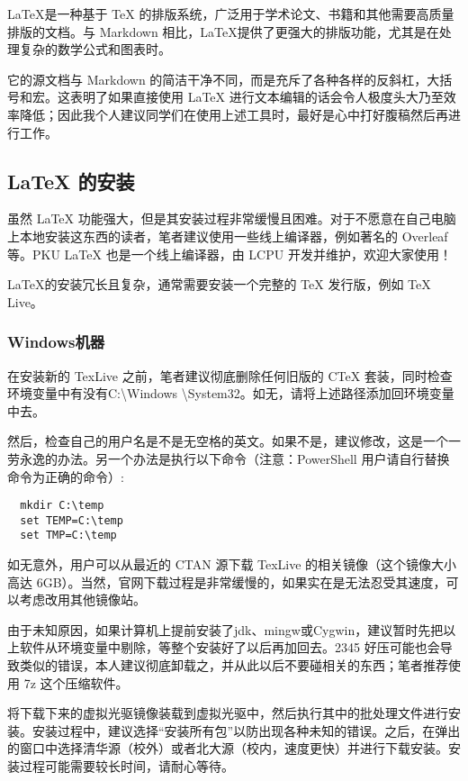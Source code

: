 \documentclass[../main.tex]{subfiles}
\begin{document}
\LaTeX 是一种基于 TeX 的排版系统，广泛用于学术论文、书籍和其他需要高质量排版的文档。与 Markdown 相比，\LaTeX 提供了更强大的排版功能，尤其是在处理复杂的数学公式和图表时。

它的源文档与 Markdown 的简洁干净不同，而是充斥了各种各样的反斜杠，大括号和宏。这表明了如果直接使用 LaTeX 进行文本编辑的话会令人极度头大乃至效率降低；因此我个人建议同学们在使用上述工具时，最好是心中打好腹稿然后再进行工作。

\subsection{LaTeX 的安装}

虽然 LaTeX 功能强大，但是其安装过程非常缓慢且困难。对于不愿意在自己电脑上本地安装这东西的读者，笔者建议使用一些线上编译器，例如著名的 Overleaf 等。PKU LaTeX 也是一个线上编译器，由 LCPU 开发并维护，欢迎大家使用！

LaTeX的安装冗长且复杂，通常需要安装一个完整的 TeX 发行版，例如 TeX Live。

\subsubsection{Windows机器}

在安装新的 TexLive 之前，笔者建议彻底删除任何旧版的 CTeX 套装，同时检查环境变量中有没有C:\textbackslash Windows \textbackslash System32。如无，请将上述路径添加回环境变量中去。

然后，检查自己的用户名是不是无空格的英文。如果不是，建议修改，这是一个一劳永逸的办法。另一个办法是执行以下命令（注意：PowerShell 用户请自行替换命令为正确的命令）:

\begin{verbatim}
  mkdir C:\temp
  set TEMP=C:\temp
  set TMP=C:\temp
\end{verbatim}

如无意外，用户可以从最近的 CTAN 源下载 TexLive 的相关镜像（这个镜像大小高达 6GB）。当然，官网下载过程是非常缓慢的，如果实在是无法忍受其速度，可以考虑改用其他镜像站。

由于未知原因，如果计算机上提前安装了jdk、mingw或Cygwin，建议暂时先把以上软件从环境变量中剔除，等整个安装好了以后再加回去。2345 好压可能也会导致类似的错误，本人建议彻底卸载之，并从此以后不要碰相关的东西；笔者推荐使用 7z 这个压缩软件。

将下载下来的虚拟光驱镜像装载到虚拟光驱中，然后执行其中的批处理文件进行安装。安装过程中，建议选择“安装所有包”以防出现各种未知的错误。之后，在弹出的窗口中选择清华源（校外）或者北大源（校内，速度更快）并进行下载安装。安装过程可能需要较长时间，请耐心等待。
\end{document}
